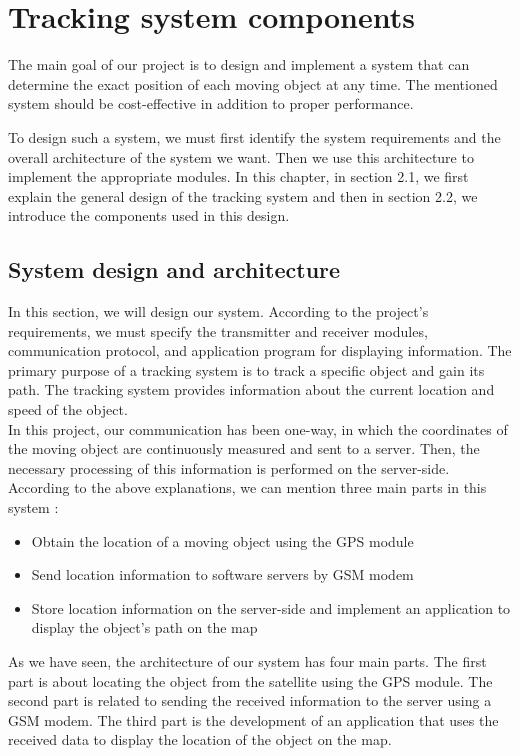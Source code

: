 \chapter{Tracking system components}
The main goal of our project is to design and implement a system that can determine the exact position of each moving object at any time. The mentioned system should be cost-effective in addition to proper performance.

To design such a system, we must first identify the system requirements and the overall architecture of the system we want. Then we use this architecture to implement the appropriate modules. In this chapter, in section 2.1, we first explain the general design of the tracking system and then in section 2.2, we introduce the components used in this design.

\section{System design and architecture}
In this section, we will design our system. According to the project's requirements, we must specify the transmitter and receiver modules, communication protocol, and application program for displaying information. The primary purpose of a tracking system is to track a specific object and gain its path. The tracking system provides information about the current location and speed of the object.\\
In this project, our communication has been one-way, in which the coordinates of the moving object are continuously measured and sent to a server. Then, the necessary processing of this information is performed on the server-side. According to the above explanations, we can mention three main parts in this system \cite{5}:
\begin{itemize}
	\item Obtain the location of a moving object using the GPS module
	\item Send location information to software servers by GSM modem
	\item Store location information on the server-side and implement an application to display the object's path on the map
\end{itemize}
As we have seen, the architecture of our system has four main parts. The first part is about locating the object from the satellite using the GPS module. The second part is related to sending the received information to the server using a GSM modem. The third part is the development of an application that uses the received data to display the location of the object on the map.\\
